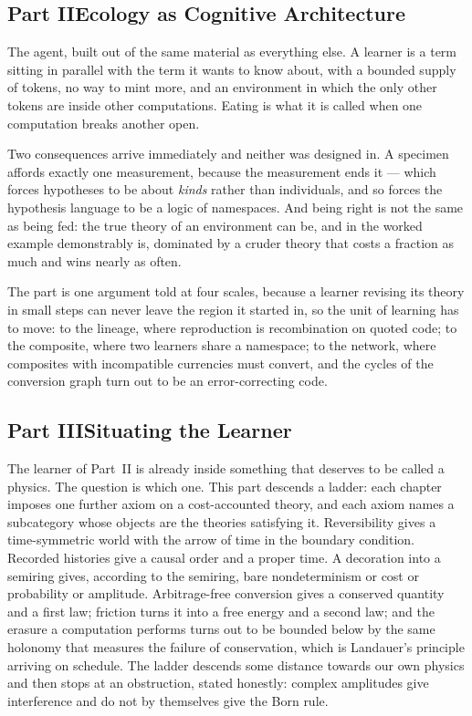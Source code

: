 \documentclass[12pt,openright,twoside]{book}
\theoremstyle{remark}
\theoremstyle{plain}
\theoremstyle{remark}
\theoremstyle{plain}
\theoremstyle{plain}
\begin{document}
\subsection*{Part II\quad Ecology as Cognitive Architecture}

The agent, built out of the same material as everything else.
A learner is a term sitting in parallel with the term it wants to know
about, with a bounded supply of tokens, no way to mint more, and an
environment in which the only other tokens are inside other computations.
Eating is what it is called when one computation breaks another open.

Two consequences arrive immediately and neither was designed in.
A specimen affords exactly one measurement, because the measurement ends
it --- which forces hypotheses to be about \emph{kinds} rather than
individuals, and so forces the hypothesis language to be a logic of
namespaces.
And being right is not the same as being fed: the true theory of an
environment can be, and in the worked example demonstrably is, dominated
by a cruder theory that costs a fraction as much and wins nearly as
often.

The part is one argument told at four scales, because a learner revising
its theory in small steps can never leave the region it started in, so
the unit of learning has to move: to the lineage, where reproduction is
recombination on quoted code; to the composite, where two learners share
a namespace; to the network, where composites with incompatible
currencies must convert, and the cycles of the conversion graph turn out
to be an error-correcting code.

\subsection*{Part III\quad Situating the Learner}

The learner of Part~II is already inside something that deserves to be
called a physics.
The question is which one.
This part descends a ladder: each chapter imposes one further axiom on a
cost-accounted theory, and each axiom names a subcategory whose objects
are the theories satisfying it.
Reversibility gives a time-symmetric world with the arrow of time in the
boundary condition.
Recorded histories give a causal order and a proper time.
A decoration into a semiring gives, according to the semiring, bare
nondeterminism or cost or probability or amplitude.
Arbitrage-free conversion gives a conserved quantity and a first law;
friction turns it into a free energy and a second law; and the erasure a
computation performs turns out to be bounded below by the same holonomy
that measures the failure of conservation, which is Landauer's principle
arriving on schedule.
The ladder descends some distance towards our own physics and then stops
at an obstruction, stated honestly: complex amplitudes give interference
and do not by themselves give the Born rule.
\end{document}
